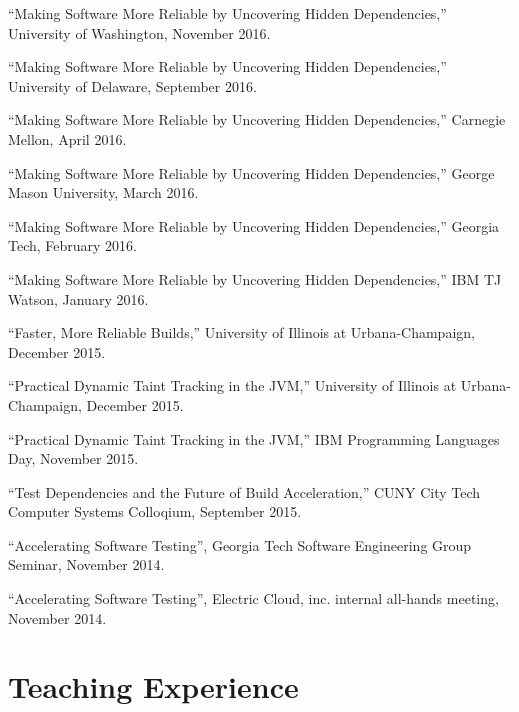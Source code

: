 \documentclass[10pt]{article}
\begin{document}
\begin{bibsection}
\item ``Making Software More Reliable by Uncovering Hidden Dependencies,'' University of Washington, November 2016.
\item ``Making Software More Reliable by Uncovering Hidden Dependencies,'' University of Delaware, September 2016.
\item \item ``Making Software More Reliable by Uncovering Hidden Dependencies,'' Carnegie Mellon, April 2016.
\item ``Making Software More Reliable by Uncovering Hidden Dependencies,'' George Mason University, March 2016.
\item ``Making Software More Reliable by Uncovering Hidden Dependencies,'' Georgia Tech, February 2016.
\item ``Making Software More Reliable by Uncovering Hidden Dependencies,'' IBM TJ Watson, January 2016.
\item ``Faster, More Reliable Builds,'' University of Illinois at Urbana-Champaign, December 2015.
\item ``Practical Dynamic Taint Tracking in the JVM,'' University of Illinois at Urbana-Champaign, December 2015.
\item ``Practical Dynamic Taint Tracking in the JVM,'' IBM Programming Languages Day, November 2015.
\item ``Test Dependencies and the Future of Build Acceleration,'' CUNY City Tech Computer Systems Colloqium, September 2015.
\item ``Accelerating Software Testing'', Georgia Tech Software Engineering Group Seminar, November 2014.
\item ``Accelerating Software Testing'', Electric Cloud, inc. internal all-hands meeting, November 2014.
\end{bibsection}


\section{Teaching Experience}
\end{document}
